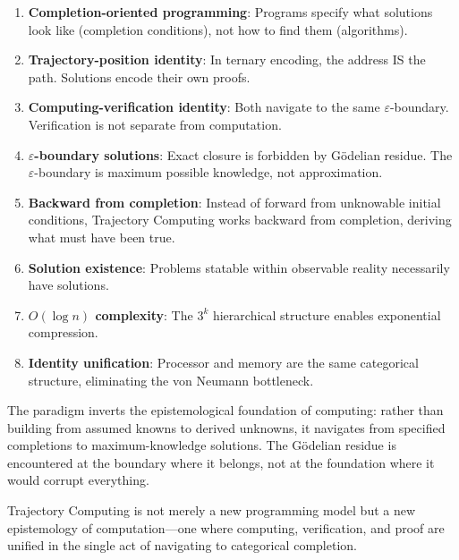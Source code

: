 \documentclass[twocolumn,10pt]{article}
\theoremstyle{remark}
\newcommand{\eps}{\varepsilon}
\begin{document}
\begin{enumerate}
    \item \textbf{Completion-oriented programming}: Programs specify what solutions look like (completion conditions), not how to find them (algorithms).

    \item \textbf{Trajectory-position identity}: In ternary encoding, the address IS the path. Solutions encode their own proofs.

    \item \textbf{Computing-verification identity}: Both navigate to the same $\eps$-boundary. Verification is not separate from computation.

    \item \textbf{$\eps$-boundary solutions}: Exact closure is forbidden by Gödelian residue. The $\eps$-boundary is maximum possible knowledge, not approximation.

    \item \textbf{Backward from completion}: Instead of forward from unknowable initial conditions, Trajectory Computing works backward from completion, deriving what must have been true.

    \item \textbf{Solution existence}: Problems statable within observable reality necessarily have solutions.

    \item \textbf{$O(\log n)$ complexity}: The $3^k$ hierarchical structure enables exponential compression.

    \item \textbf{Identity unification}: Processor and memory are the same categorical structure, eliminating the von Neumann bottleneck.
\end{enumerate}

The paradigm inverts the epistemological foundation of computing: rather than building from assumed knowns to derived unknowns, it navigates from specified completions to maximum-knowledge solutions. The Gödelian residue is encountered at the boundary where it belongs, not at the foundation where it would corrupt everything.

Trajectory Computing is not merely a new programming model but a new epistemology of computation---one where computing, verification, and proof are unified in the single act of navigating to categorical completion.



\end{document}
